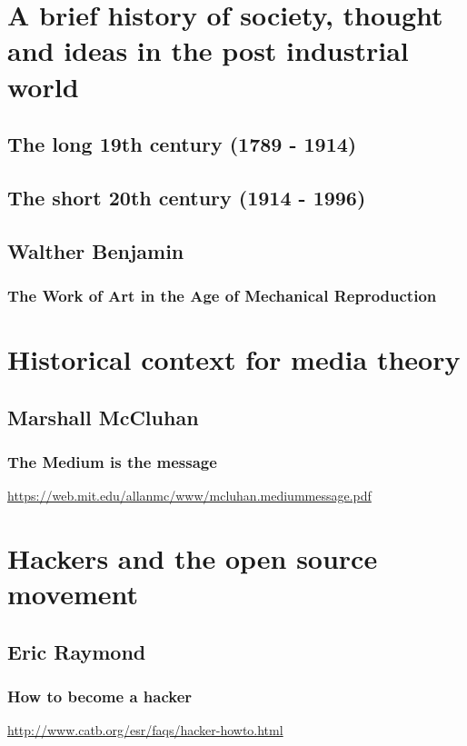 \documentclass[11pt]{article}
\begin{document}
\section{A brief history of society, thought and ideas in the post industrial world}
\label{sec:orgf51378a}

\subsection{The long 19th century (1789 - 1914)}
\label{sec:org6c6702a}
\subsection{The short 20th century (1914 - 1996)}
\label{sec:org99756ba}

\subsection{Walther Benjamin}
\label{sec:org8a09f35}
\subsubsection{The Work of Art in the Age of Mechanical Reproduction}
\label{sec:orgad8d373}

\section{Historical context for media theory}
\label{sec:orga1fcc97}
\subsection{Marshall McCluhan}
\label{sec:orgcf9a0db}
\subsubsection{The Medium is the message}
\label{sec:org7f236f1}
\url{https://web.mit.edu/allanmc/www/mcluhan.mediummessage.pdf}

\section{Hackers and the open source movement}
\label{sec:org0938e33}

\subsection{Eric Raymond}
\label{sec:org42034ff}
\subsubsection{How to become a hacker}
\label{sec:org9e1e646}
\url{http://www.catb.org/esr/faqs/hacker-howto.html}
\end{document}
